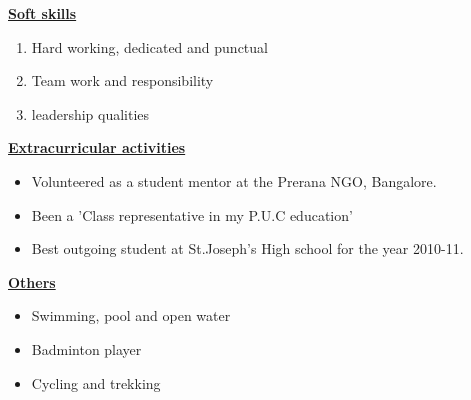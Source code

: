 \documentclass[10pt]{article}
\begin{document}
			\underline{\textbf{\Large{Soft skills}}}
			\begin{enumerate}
				\item{Hard working, dedicated and punctual}
				\item{Team work and responsibility}
				\item{leadership qualities} 
				
			\end{enumerate}
			
			\hfill
			
		\underline{\textbf{\Large{Extracurricular activities}}}
		\begin{itemize}
			\item{Volunteered as a student mentor at the Prerana NGO, Bangalore.}
			\item{Been a 'Class representative in my P.U.C education'}
			\item{Best outgoing student at St.Joseph's High school for the year 2010-11.}
			
		\end{itemize}
		
		\hfill
		
			\underline{\textbf{\Large{Others}}}
			\begin{itemize}
				\item{Swimming, pool and open water}
				\item{Badminton player}
				\item{Cycling and trekking}					
				
			\end{itemize}
			
			\hfill
	
\end{document}
